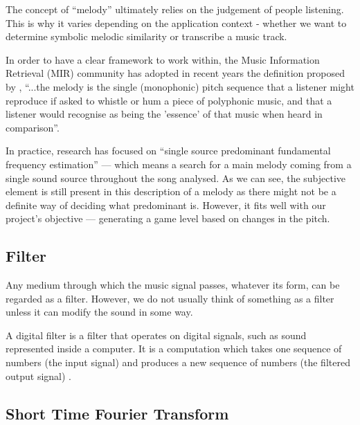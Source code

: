 The concept of “melody” ultimately relies on the judgement of people listening. This is why it varies depending on the application context - whether we want to determine symbolic melodic similarity or transcribe a music track. 

In order to have a clear framework to work within, the Music Information Retrieval (MIR) community has adopted in recent years the definition proposed by \cite{melodydef}, ``...the melody is the single (monophonic) pitch sequence that a listener might reproduce if asked to whistle or hum a piece of polyphonic music, and that a listener would recognise as being the 'essence' of that music when heard in comparison''.

In practice, research has focused on ``single source predominant fundamental frequency estimation'' — which means a search for a main melody coming from a single sound source throughout the song analysed. As we can see, the subjective element is still present in this description of a melody as there might not be a definite way of deciding what predominant is. However, it fits well with our project’s objective — generating a game level based on changes in the pitch.

\vspace{10pt}

\subsection{Filter}

Any medium through which the music signal passes, whatever its form, can be regarded as a filter. However, we do not usually think of something as a filter unless it can modify the sound in some way. 

A digital filter is a filter that operates on digital signals, such as sound represented inside a computer. It is a computation which takes one sequence of numbers (the input signal) and produces a new sequence of numbers (the filtered output signal) \cite{filters}.

\vspace{10pt}

\subsection{Short Time Fourier Transform}

